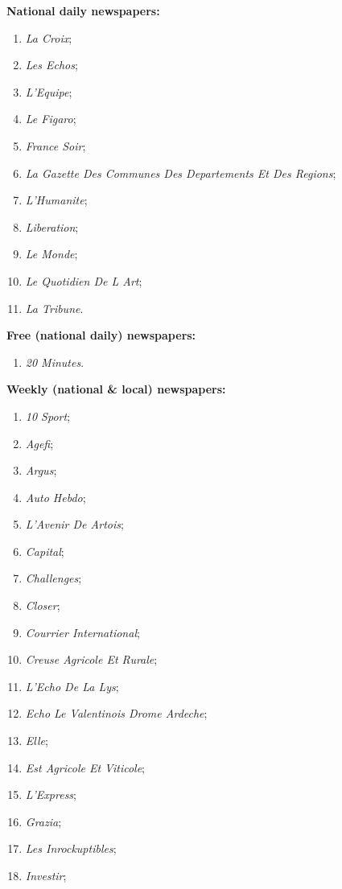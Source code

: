 \begin{multicols}{2}
\textbf{National daily newspapers:}
	\begin{enumerate}
	\item \textit{La Croix};
	\item \textit{Les Echos};
	\item \textit{L'Equipe};
	\item \textit{Le Figaro};
	\item \textit{France Soir};
	\item \textit{La Gazette Des Communes Des Departements Et Des Regions};
	\item \textit{L'Humanite};
	\item \textit{Liberation};
	\item \textit{Le Monde};
	\item \textit{Le Quotidien De L Art};
	\item \textit{La Tribune}.
	\end{enumerate}		
\medskip
\textbf{Free (national daily) newspapers:}
	\begin{enumerate}
	\item \textit{20 Minutes}.
	\end{enumerate}
\medskip
\textbf{Weekly (national \& local) newspapers:}	
	\begin{enumerate}
	\item \textit{10 Sport};
	\item \textit{Agefi};
	\item \textit{Argus};
	\item \textit{Auto Hebdo};
	\item \textit{L'Avenir De Artois};
	\item \textit{Capital};
	\item \textit{Challenges};
	\item \textit{Closer};
	\item \textit{Courrier International};
	\item \textit{Creuse Agricole Et Rurale};
	\item \textit{L'Echo De La Lys};
	\item \textit{Echo Le Valentinois Drome Ardeche};
	\item \textit{Elle};
	\item \textit{Est Agricole Et Viticole};
	\item \textit{L'Express};
	\item \textit{Grazia};
	\item \textit{Les Inrockuptibles};
	\item \textit{Investir};

\end{enumerate}
\end{multicols}
